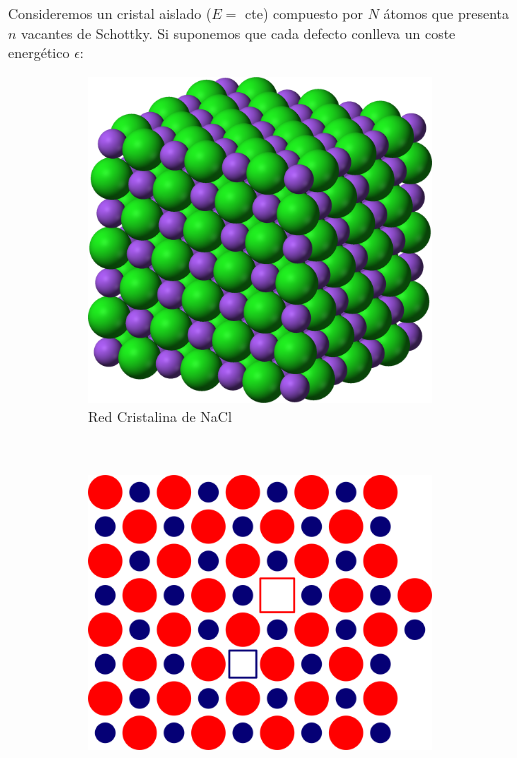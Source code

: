 \documentclass[a4paper,11pt]{article}
\begin{document}
Consideremos un cristal aislado ($E = $ cte) compuesto por $N$ átomos 
que presenta $n$ vacantes de Schottky.
Si suponemos que cada defecto conlleva un coste energético $\epsilon$:


\begin{figure}[b]
    \centering
    \begin{subfigure}[b]{0.3\textwidth}
        \includegraphics[width=\textwidth]{figs/NaCl.png}
        \caption{Red Cristalina de NaCl}
        \label{fig:nacl}
    \end{subfigure}
    ~
    \begin{subfigure}[b]{0.3\textwidth}
        \includegraphics[width=\textwidth]{figs/schottky.png}

\end{subfigure}
\end{figure}
\end{document}
